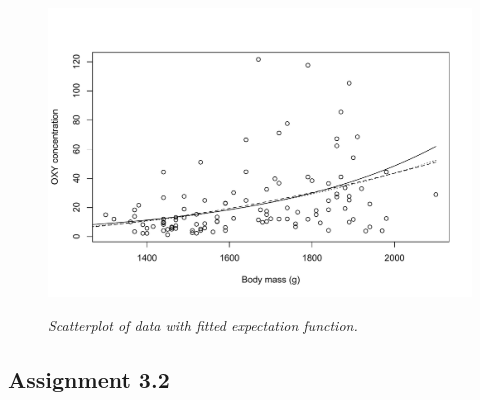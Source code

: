 \documentclass[12pt]{article}
\begin{document}
\begin{enumerate}
    \begin{figure}[h!]
      \caption{\emph{Scatterplot of data with fitted expectation function.}}
      \centering
      \includegraphics[width=.8\textwidth]{./figures/hw03_fitted.pdf}
      \label{fig:3}
    \end{figure}
\end{enumerate}


\newpage


\subsection*{Assignment 3.2}
\end{document}
